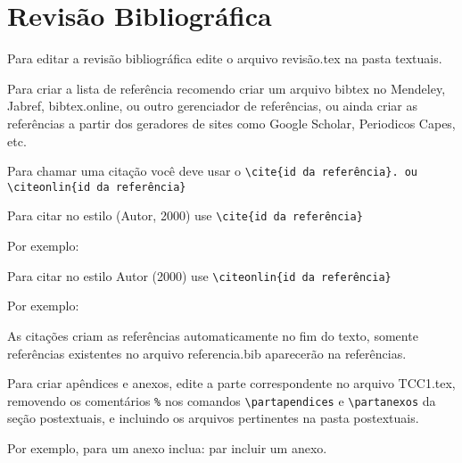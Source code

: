 \chapter{Revisão Bibliográfica}
Para editar a revisão bibliográfica edite o arquivo revisão.tex na pasta textuais. 
\par
Para criar a lista de referência recomendo criar um arquivo bibtex no Mendeley, Jabref, bibtex.online, ou outro gerenciador de referências, ou ainda criar as referências a partir dos geradores de sites como Google Scholar, Periodicos Capes, etc. 
\par
Para chamar uma citação você deve usar o \verb+\cite{id da referência}. ou \citeonlin{id da referência}+
\par
Para citar no estilo (Autor, 2000) use \verb+\cite{id da referência}+
\par
Por exemplo: \cite{Abuidris2019}
\par
Para citar no estilo Autor (2000) use \verb+\citeonlin{id da referência}+
\par
Por exemplo: 
\par
As citações criam as referências automaticamente no fim do texto, somente referências existentes no arquivo referencia.bib aparecerão na referências.

Para criar apêndices e anexos, edite a parte correspondente no arquivo TCC1.tex, removendo os comentários \verb+%+ nos comandos \verb+\partapendices+ e \verb+\partanexos+ da seção postextuais, e incluindo os arquivos pertinentes na pasta postextuais.

Por exemplo, para um anexo inclua: \verb++ par incluir um anexo. 
